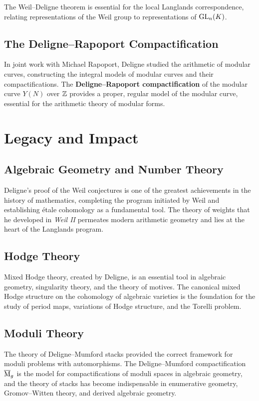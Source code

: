 The Weil--Deligne theorem is essential for the local Langlands correspondence, relating representations of the Weil group to representations of \(\operatorname{GL}_n(K)\).

\subsection{The Deligne--Rapoport Compactification}

In joint work with Michael Rapoport, Deligne studied the arithmetic of modular curves, constructing the integral models of modular curves and their compactifications. The \textbf{Deligne--Rapoport compactification} of the modular curve \(Y(N)\) over \(\mathbb{Z}\) provides a proper, regular model of the modular curve, essential for the arithmetic theory of modular forms.

\section{Legacy and Impact}

\subsection{Algebraic Geometry and Number Theory}

Deligne's proof of the Weil conjectures is one of the greatest achievements in the history of mathematics, completing the program initiated by Weil and establishing \'etale cohomology as a fundamental tool. The theory of weights that he developed in \textit{Weil II} permeates modern arithmetic geometry and lies at the heart of the Langlands program.

\subsection{Hodge Theory}

Mixed Hodge theory, created by Deligne, is an essential tool in algebraic geometry, singularity theory, and the theory of motives. The canonical mixed Hodge structure on the cohomology of algebraic varieties is the foundation for the study of period maps, variations of Hodge structure, and the Torelli problem.

\subsection{Moduli Theory}

The theory of Deligne--Mumford stacks provided the correct framework for moduli problems with automorphisms. The Deligne--Mumford compactification \(\overline{\operatorname{M}}_g\) is the model for compactifications of moduli spaces in algebraic geometry, and the theory of stacks has become indispensable in enumerative geometry, Gromov--Witten theory, and derived algebraic geometry.


